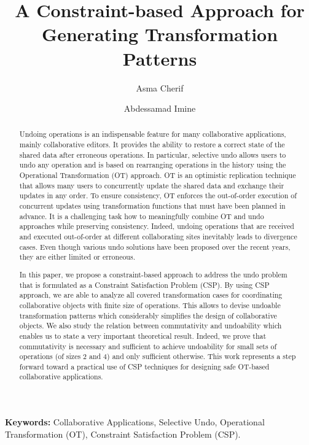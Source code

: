 \documentclass[submission,copyright,creativecommons]{eptcs}
\title{A Constraint-based Approach for Generating Transformation Patterns}
\author{Asma Cherif
\institute{Umm Al-Qura University\\ Makkah, Saudi Arabia} 
\email{ahcherif@mail.uqu.edu.sa}
\and
Abdessamad Imine
\institute{Lorraine Univeristy and Inria Nancy Grand-Est\\
Nancy, France}
\email{\quad imine@loria.fr }
}
\begin{document}
\sloppy
\maketitle

\begin{abstract}


Undoing operations is an    indispensable feature for many
collaborative applications, mainly  collaborative editors. It
provides the ability to restore a correct state of the shared data
after erroneous operations. In particular, selective undo allows
users to undo any operation and is based on rearranging operations
in the history using the Operational Transformation (OT) approach. OT is an optimistic replication technique that allows many users to concurrently update the shared data and exchange
their updates in any order. To ensure consistency, OT enforces the out-of-order execution of concurrent updates using transformation functions that must have been planned in advance.
It is a challenging task how to meaningfully combine OT and undo approaches while preserving consistency. Indeed, undoing operations that are received and executed out-of-order at different collaborating sites inevitably leads to divergence cases.
Even though various   undo solutions have been proposed over
the recent years, they are either limited or erroneous. 

In this paper, we propose a constraint-based approach to address the undo problem that
is formulated as a Constraint Satisfaction Problem (CSP). By using CSP approach, we are able to analyze all covered transformation cases for coordinating collaborative objects with finite size of operations. This allows to devise undoable transformation patterns which considerably simplifies the design of collaborative objects. We also study the relation between commutativity and undoability which enables us to state
a very important theoretical result. Indeed, we prove that   commutativity is necessary and sufficient to achieve undoability for small sets of operations (of sizes 2 and 4) and only sufficient otherwise. This work represents a step forward toward
a practical use of CSP techniques for designing safe OT-based collaborative applications.
\end{abstract}
 
\noindent \textbf{Keywords:}  Collaborative Applications, Selective Undo, Operational Transformation (OT), Constraint Satisfaction Problem (CSP). 
\end{document}
